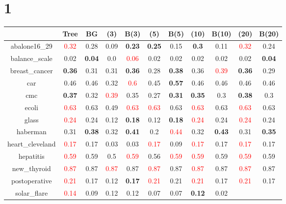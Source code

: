 \documentclass{article}%
\begin{document}
\section*{1}%
\begin{tabular}{c|cccccccccc}%
\hline%
&Tree&BG&(3)&B(3)&(5)&B(5)&(10)&B(10)&(20)&B(20)\\%
\hline%
abalone16\_29&\textcolor{red}{ 
0.32
}&0.28&0.09&\textbf{0.23}&\textbf{0.25}&0.15&\textbf{0.3}&0.11&\textcolor{red}{ 
0.32
}&0.24\\%
\hline%
balance\_scale&0.02&\textbf{0.04}&0.0&\textcolor{red}{ 
0.06
}&0.02&0.02&0.02&0.02&0.02&\textbf{0.04}\\%
\hline%
breast\_cancer&\textbf{0.36}&0.31&0.31&\textbf{0.36}&0.28&\textbf{0.38}&0.36&\textcolor{red}{ 
0.39
}&\textbf{0.36}&0.29\\%
\hline%
car&0.46&0.46&0.32&\textcolor{red}{ 
0.6
}&0.45&\textbf{0.57}&0.46&0.46&0.46&0.46\\%
\hline%
cmc&\textbf{0.37}&0.32&\textcolor{red}{ 
0.39
}&0.35&0.27&\textbf{0.31}&\textbf{0.35}&0.3&\textbf{0.38}&0.3\\%
\hline%
ecoli&\textcolor{red}{ 
0.63
}&0.63&0.49&\textcolor{red}{ 
0.63
}&\textcolor{red}{ 
0.63
}&0.63&\textcolor{red}{ 
0.63
}&0.63&\textcolor{red}{ 
0.63
}&0.63\\%
\hline%
glass&\textcolor{red}{ 
0.24
}&0.24&0.12&\textbf{0.18}&0.12&\textbf{0.18}&\textcolor{red}{ 
0.24
}&0.24&\textcolor{red}{ 
0.24
}&0.24\\%
\hline%
haberman&0.31&\textbf{0.38}&0.32&\textbf{0.41}&0.2&\textcolor{red}{ 
0.44
}&0.32&\textbf{0.43}&0.31&\textbf{0.35}\\%
\hline%
heart\_cleveland&\textcolor{red}{ 
0.17
}&0.17&0.03&0.03&\textcolor{red}{ 
0.17
}&0.09&\textcolor{red}{ 
0.17
}&0.17&\textcolor{red}{ 
0.17
}&0.17\\%
\hline%
hepatitis&\textcolor{red}{ 
0.59
}&0.59&0.5&\textcolor{red}{ 
0.59
}&0.56&\textcolor{red}{ 
0.59
}&\textcolor{red}{ 
0.59
}&0.59&\textcolor{red}{ 
0.59
}&0.59\\%
\hline%
new\_thyroid&\textcolor{red}{ 
0.87
}&0.87&\textcolor{red}{ 
0.87
}&0.87&\textcolor{red}{ 
0.87
}&0.87&\textcolor{red}{ 
0.87
}&0.87&\textcolor{red}{ 
0.87
}&0.87\\%
\hline%
postoperative&\textcolor{red}{ 
0.21
}&0.17&0.12&\textbf{0.17}&\textcolor{red}{ 
0.21
}&0.21&\textcolor{red}{ 
0.21
}&0.17&\textcolor{red}{ 
0.21
}&0.17\\%
\hline%
solar\_flare&\textcolor{red}{ 
0.14
}&0.09&0.12&0.12&0.07&0.07&\textbf{0.12}&0.02&\textcolor{red}{ 
}
\end{tabular}
\end{document}
